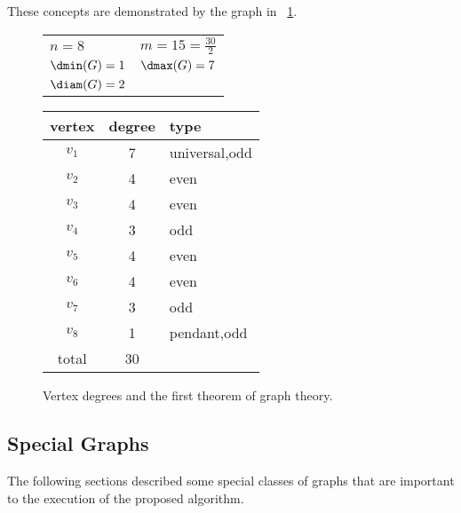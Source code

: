 These concepts are demonstrated by the graph in \figurename~\ref{fig:degree}.

\begin{figure}[H]
  \begin{minipage}{3.25in}
    \centering

    \bigskip

    \begin{tabular}{ll}
      \(n=8\) & \(m=15=\frac{30}{2}\) \\
      \(\dmin(G)=1\) & \(\dmax(G)=7\) \\
      \(\diam(G)=2\)
    \end{tabular}
  \end{minipage}
  \begin{minipage}{2.5in}
    \begin{tabular}{c|c|l}
      vertex & degree & type \\
      \hline
      \(v_1\) & 7 & universal,odd \\
      \(v_2\) & 4 & even \\
      \(v_3\) & 4 & even \\
      \(v_4\) & 3 & odd \\
      \(v_5\) & 4 & even \\
      \(v_6\) & 4 & even \\
      \(v_7\) & 3 & odd \\
      \(v_8\) & 1 & pendant,odd \\
      \hline
      total & 30 &
    \end{tabular}
  \end{minipage}
  \caption{Vertex degrees and the first theorem of graph theory.}
  \label{fig:degree}
\end{figure}

\subsection{Special Graphs}\label{sec:sub:special}

The following sections described some special classes of graphs that are important to the execution of the proposed
algorithm.

